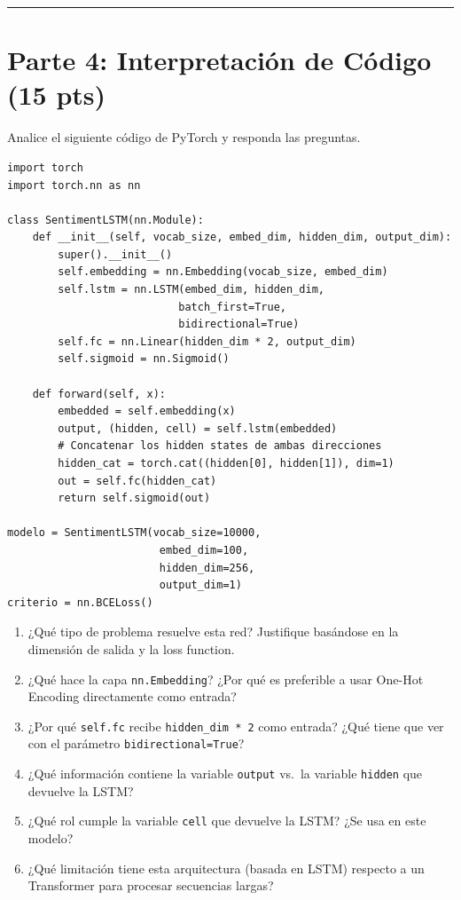\documentclass[12pt,a4paper]{article}
\begin{document}
\vspace{0.5cm}
\hrule
\vspace{0.5cm}

\section*{Parte 4: Interpretación de Código (15 pts)}

Analice el siguiente código de PyTorch y responda las preguntas.

\begin{lstlisting}
import torch
import torch.nn as nn

class SentimentLSTM(nn.Module):
    def __init__(self, vocab_size, embed_dim, hidden_dim, output_dim):
        super().__init__()
        self.embedding = nn.Embedding(vocab_size, embed_dim)
        self.lstm = nn.LSTM(embed_dim, hidden_dim,
                           batch_first=True,
                           bidirectional=True)
        self.fc = nn.Linear(hidden_dim * 2, output_dim)
        self.sigmoid = nn.Sigmoid()

    def forward(self, x):
        embedded = self.embedding(x)
        output, (hidden, cell) = self.lstm(embedded)
        # Concatenar los hidden states de ambas direcciones
        hidden_cat = torch.cat((hidden[0], hidden[1]), dim=1)
        out = self.fc(hidden_cat)
        return self.sigmoid(out)

modelo = SentimentLSTM(vocab_size=10000,
                        embed_dim=100,
                        hidden_dim=256,
                        output_dim=1)
criterio = nn.BCELoss()
\end{lstlisting}

\begin{enumerate}[label=\alph*)]
    \item ¿Qué tipo de problema resuelve esta red? Justifique basándose en la dimensión de salida y la loss function.

    \item ¿Qué hace la capa \texttt{nn.Embedding}? ¿Por qué es preferible a usar One-Hot Encoding directamente como entrada?

    \item ¿Por qué \texttt{self.fc} recibe \texttt{hidden\_dim * 2} como entrada? ¿Qué tiene que ver con el parámetro \texttt{bidirectional=True}?

    \item ¿Qué información contiene la variable \texttt{output} vs.\ la variable \texttt{hidden} que devuelve la LSTM?

    \item ¿Qué rol cumple la variable \texttt{cell} que devuelve la LSTM? ¿Se usa en este modelo?

    \item ¿Qué limitación tiene esta arquitectura (basada en LSTM) respecto a un Transformer para procesar secuencias largas?
\end{enumerate}
\end{document}
